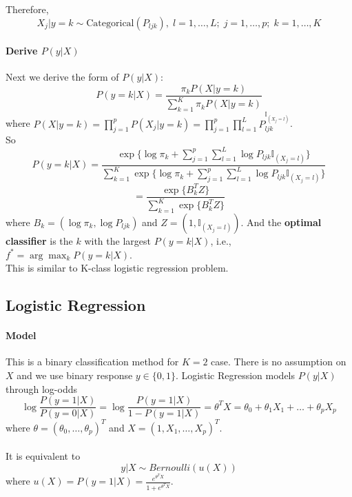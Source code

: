 \documentclass[12pt]{book}
\theoremstyle{definition}
\theoremstyle{remark}
\begin{document}
Therefore, 
\[X_j|y = k \sim \text{Categorical}(P_{ljk}),\; l = 1,\dots,L; \;j = 1,\dots, p;\;k = 1,\dots, K\]

\paragraph{Derive $P(y|X)$}
Next we derive the form of $P(y|X)$:
\[P(y = k|X) = \frac{\pi_kP(X|y=k)}{\sum_{k=1}^K\pi_kP(X|y=k)}\]
where $P(X|y=k) = \prod_{j=1}^pP(X_j|y=k) = \prod_{j=1}^p\prod_{l=1}^LP_{ljk}^{\mathbb{I}_{(X_j = l)}}$.\\

So \[P(y = k|X) = \frac{\exp\{\log \pi_k+\sum_{j=1}^p\sum_{l=1}^L\log P_{ljk}\mathbb{I}_{(X_j = l)}\}}{\sum_{k=1}^K\exp\{\log \pi_k+\sum_{j=1}^p\sum_{l=1}^L\log P_{ljk}\mathbb{I}_{(X_j = l)}\}}\]
\[ = \frac{\exp\{B_k^TZ\}}{\sum_{k=1}^K\exp\{B_k^TZ\}}\]
where $B_k = (\log \pi_k, \log P_{ljk})$ and $Z = (1, \mathbb{I}_{(X_j = l)})$. And the \textbf{optimal classifier} is the $k$ with the largest $P(y=k|X)$, i.e., $f^* = \arg\max_kP(y=k|X)$.\\
This is similar to K-class logistic regression problem.\\

\subsection{Logistic Regression}
\paragraph{Model}
This is a binary classification method for $K = 2$ case. There is no assumption on $X$ and we use binary response $y \in \{0,1\}$. Logistic Regression models $P(y|X)$ through log-odds
\[\log \frac{P(y = 1|X)}{P(y=0|X)} = \log \frac{P(y=1|X)}{1-P(y=1|X)} = 
\theta^TX = \theta_0+\theta_1X_1+\dots+\theta_pX_p\]
where $\theta = (\theta_0,\dots,\theta_p)^T$ and $X = (1,X_1, \dots, X_p)^T$.\\
\\
It is equivalent to \[y|X \sim Bernoulli(u(X))\]
where $u(X) = P(y=1|X) = \frac{e^{\theta^TX}}{1+e^{\theta^TX}}$.\\
\end{document}
